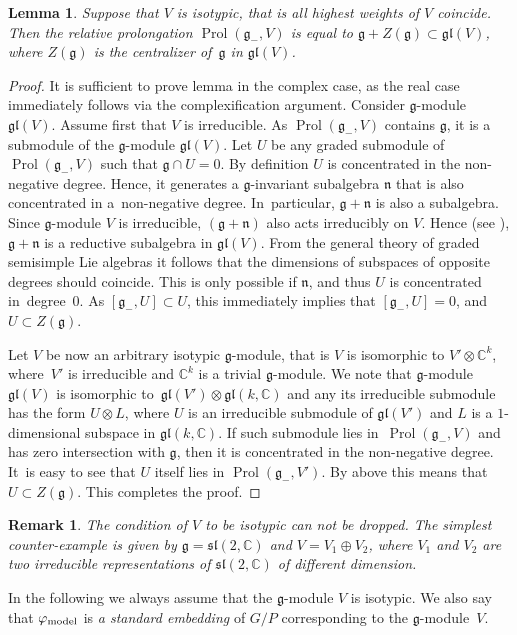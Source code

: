 \documentclass[pdftex]{sigma}%
\newcommand{\C}{\mathbb C}
\newcommand{\g}{\mathfrak g}
\newcommand{\gl}{\mathfrak{gl}}
\newcommand{\n}{\mathfrak n}
\newcommand{\V}{V}
\newcommand{\sll}{\mathfrak{sl}}
\newcommand{\Prol}{\operatorname{Prol}}
\newtheorem{lem}[thm]{Lemma}
\newtheorem{rem}[thm]{Remark}}
\numberwithin{equation}{section}
\begin{document}
\begin{lem}\label{symalg}
	Suppose that $\V$ is isotypic, that is all highest weights of $\V$ coincide. Then the relative prolongation $\Prol(\g_{-},\V)$ is equal to $\g+Z(\g)\subset \gl(\V)$, where $Z(\g)$ is the centralizer of~$\g$ in $\gl(\V)$.
\end{lem}
\begin{proof}
	It is sufficient to prove lemma in the complex case, as the real case immediately follows via the complexification argument. Consider $\g$-module $\gl(\V)$. Assume first that $\V$ is irreducible. As $\Prol(\g_{-},\V)$ contains $\g$, it is a submodule of the $\g$-module $\gl(\V)$. Let $U$ be any graded submodule of $\Prol(\g_{-},\V)$ such that $\g\cap U = 0$. By definition $U$ is concentrated in the non-negative degree. Hence, it generates a $\g$-invariant subalgebra $\n$ that is also concentrated in a~non-negative degree. In~particular, $\g+\n$ is also a subalgebra. Since $\g$-module $\V$ is irreducible, $(\g+\n)$ also acts irreducibly on $\V$. Hence (see \cite[{Chapitre~1, Section~6, Th\'eor\`eme~4}]{bou}), $\g+\n$ is a reductive subalgebra in $\gl(\V)$. From the general theory of graded semisimple Lie algebras it follows that the dimensions of subspaces of opposite degrees should coincide. This is only possible if $\n$, and thus $U$ is concentrated in~degree~$0$. As $[\g_{-},U]\subset U$, this immediately implies that $[\g_{-}, U] =0$, and $U\subset Z(\g)$.
	
	Let $\V$ be now an arbitrary isotypic $\g$-module, that is $\V$ is isomorphic to $\V'\otimes \C^k$, where~$\V'$ is irreducible and $\C^k$ is a trivial $\g$-module. We note that $\g$-module $\gl(\V)$ is isomorphic to~$\gl(\V')\otimes\gl(k,\C)$ and any its irreducible submodule has the form $U\otimes L$, where $U$ is an irreducible submodule of $\gl(\V')$ and $L$ is a $1$-dimensional subspace in $\gl(k,\C)$. If such submodule lies in~$\Prol(\g_{-},\V)$ and has zero intersection with $\g$, then it is concentrated in the non-negative degree. It~is easy to see that $U$ itself lies in $\Prol(\g_{-},\V')$. By above this means that $U\subset Z(\g)$. This completes the proof.
\end{proof}

\begin{rem}
	The condition of $\V$ to be isotypic can not be dropped. The simplest counter-example is given by $\g=\sll(2,\C)$ and $\V=V_1\oplus V_2$,	where $V_1$ and $V_2$ are two irreducible representations of $\sll(2,\C)$ of different dimension.
\end{rem}
In the following we always assume that the $\g$-module $\V$ is isotypic.
We also say that $\varphi_{{\rm model}}$ is \emph{a standard embedding} of $G/P$ corresponding to the $\g$-module~$\V$.
\end{document}
